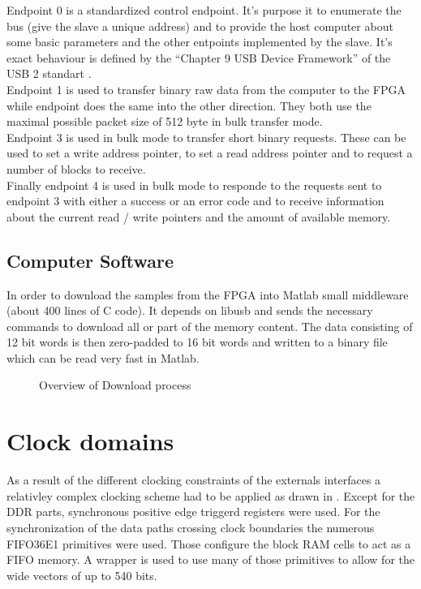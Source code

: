 Endpoint 0 is a standardized control endpoint. It's purpose it to
enumerate the bus (give the slave a unique address) and to provide the
host computer about some basic parameters and the other entpoints
implemented by the slave. It's exact behaviour is defined by the
``Chapter 9 USB Device Framework'' of the USB 2 standart . \\

Endpoint 1 is used to transfer binary raw data from the computer to the \gls{FPGA}
while endpoint does the same into the other direction. They both use the maximal
possible packet size of 512 byte in bulk transfer mode. \\

Endpoint 3 is used in bulk mode to transfer short binary requests.
These can be used to set a write address pointer, to set a read address pointer
and to request a number of blocks to receive. \\

Finally endpoint 4 is used in bulk mode to responde to the requests sent
to endpoint 3 with either a success or an error code and to receive information
about the current read / write pointers and the amount of available memory. \\

\subsection{Computer Software}
In order to download the samples from the \gls{FPGA} into Matlab small 
middleware (about 400 lines of C code). It depends on libusb 
and sends the necessary commands to download all or part of the memory content.
The data consisting of 12 bit words is then zero-padded to 16 bit words
and written to a binary file which can be read very fast in Matlab.

\begin{figure}[ht]
  \centering
  \caption{Overview of Download process}
  \label{fig:fpga_architecture_overview}
\end{figure}

\section{Clock domains}
\label{sec:fpga_clocks}

As a result of the different clocking constraints of the externals interfaces
a relativley complex clocking scheme had to be applied as drawn in
. Except for the \gls{DDR} parts,
synchronous positive edge triggerd registers were used. For the synchronization
of the data paths crossing clock boundaries the numerous FIFO36E1 primitives
were used. Those configure the block \gls{RAM} cells to act as a \gls{FIFO}
memory. A wrapper is used to use many of those primitives to allow for the
wide vectors of up to 540 bits. \\

